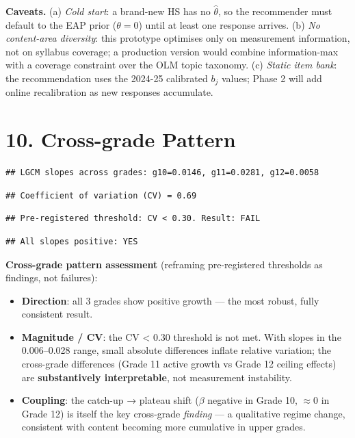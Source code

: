\documentclass[
]{article}
\providecommand{\tightlist}{%
  \setlength{\itemsep}{0pt}\setlength{\parskip}{0pt}}
\begin{document}
\textbf{Caveats.} (a) \emph{Cold start}: a brand-new HS has no
\(\hat\theta\), so the recommender must default to the EAP prior
(\(\theta=0\)) until at least one response arrives. (b) \emph{No
content-area diversity}: this prototype optimises only on measurement
information, not on syllabus coverage; a production version would
combine information-max with a coverage constraint over the OLM topic
taxonomy. (c) \emph{Static item bank}: the recommendation uses the
2024-25 calibrated \(b_j\) values; Phase 2 will add online recalibration
as new responses accumulate.

\hypertarget{cross-grade-pattern}{%
\section{10. Cross-grade Pattern}\label{cross-grade-pattern}}

\begin{verbatim}
## LGCM slopes across grades: g10=0.0146, g11=0.0281, g12=0.0058
\end{verbatim}

\begin{verbatim}
## Coefficient of variation (CV) = 0.69
\end{verbatim}

\begin{verbatim}
## Pre-registered threshold: CV < 0.30. Result: FAIL
\end{verbatim}

\begin{verbatim}
## All slopes positive: YES
\end{verbatim}

\textbf{Cross-grade pattern assessment} (reframing pre-registered
thresholds as findings, not failures):

\begin{itemize}
\tightlist
\item
  \textbf{Direction}: all 3 grades show positive growth --- the most
  robust, fully consistent result.
\item
  \textbf{Magnitude / CV}: the CV \textless{} 0.30 threshold is not met.
  With slopes in the 0.006--0.028 range, small absolute differences
  inflate relative variation; the cross-grade differences (Grade 11
  active growth vs Grade 12 ceiling effects) are \textbf{substantively
  interpretable}, not measurement instability.
\item
  \textbf{Coupling}: the catch-up → plateau shift (\(\beta\) negative in
  Grade 10, \(\approx 0\) in Grade 12) is itself the key cross-grade
  \emph{finding} --- a qualitative regime change, consistent with
  content becoming more cumulative in upper grades.
\end{itemize}
\end{document}
